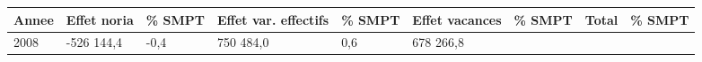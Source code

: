 \begin{longtable}[]{@{}lllllllll@{}}
\toprule
\begin{minipage}[b]{0.05\columnwidth}\raggedright
Annee\strut
\end{minipage} & \begin{minipage}[b]{0.10\columnwidth}\raggedright
Effet noria\strut
\end{minipage} & \begin{minipage}[b]{0.06\columnwidth}\raggedright
\% SMPT\strut
\end{minipage} & \begin{minipage}[b]{0.16\columnwidth}\raggedright
Effet var. effectifs\strut
\end{minipage} & \begin{minipage}[b]{0.06\columnwidth}\raggedright
\% SMPT\strut
\end{minipage} & \begin{minipage}[b]{0.12\columnwidth}\raggedright
Effet vacances\strut
\end{minipage} & \begin{minipage}[b]{0.06\columnwidth}\raggedright
\% SMPT\strut
\end{minipage} & \begin{minipage}[b]{0.10\columnwidth}\raggedright
Total\strut
\end{minipage} & \begin{minipage}[b]{0.06\columnwidth}\raggedright
\% SMPT\strut
\end{minipage}\tabularnewline
\midrule
\endhead
\begin{minipage}[t]{0.05\columnwidth}\raggedright
2008\strut
\end{minipage} & \begin{minipage}[t]{0.10\columnwidth}\raggedright
-526 144,4\strut
\end{minipage} & \begin{minipage}[t]{0.06\columnwidth}\raggedright
-0,4\strut
\end{minipage} & \begin{minipage}[t]{0.16\columnwidth}\raggedright
750 484,0\strut
\end{minipage} & \begin{minipage}[t]{0.06\columnwidth}\raggedright
0,6\strut
\end{minipage} & \begin{minipage}[t]{0.12\columnwidth}\raggedright
678 266,8\strut
\end{minipage} & \begin{minipage}[t]{0.06\columnwidth}\raggedright

\end{minipage}
\end{longtable}
